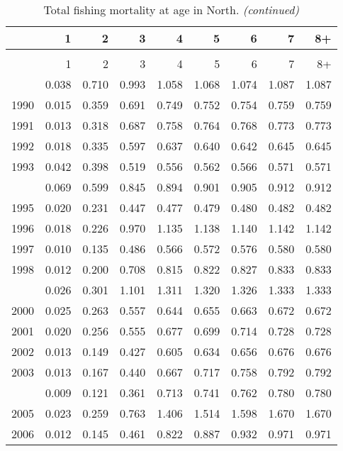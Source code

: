 \documentclass[
]{article}
\begin{document}
\begin{longtable}[t]{lrrrrrrrr}
\caption{\label{tab:North-region-FAA-table}Total fishing mortality at age in North.}\\
\toprule
  & 1 & 2 & 3 & 4 & 5 & 6 & 7 & 8+\\
\midrule
\endfirsthead
\caption[]{Total fishing mortality at age in North. \textit{(continued)}}\\
\toprule
  & 1 & 2 & 3 & 4 & 5 & 6 & 7 & 8+\\
\midrule
\endhead

\endfoot
\bottomrule
\endlastfoot
1989 & 0.038 & 0.710 & 0.993 & 1.058 & 1.068 & 1.074 & 1.087 & 1.087\\
1990 & 0.015 & 0.359 & 0.691 & 0.749 & 0.752 & 0.754 & 0.759 & 0.759\\
1991 & 0.013 & 0.318 & 0.687 & 0.758 & 0.764 & 0.768 & 0.773 & 0.773\\
1992 & 0.018 & 0.335 & 0.597 & 0.637 & 0.640 & 0.642 & 0.645 & 0.645\\
1993 & 0.042 & 0.398 & 0.519 & 0.556 & 0.562 & 0.566 & 0.571 & 0.571\\
\addlinespace
1994 & 0.069 & 0.599 & 0.845 & 0.894 & 0.901 & 0.905 & 0.912 & 0.912\\
1995 & 0.020 & 0.231 & 0.447 & 0.477 & 0.479 & 0.480 & 0.482 & 0.482\\
1996 & 0.018 & 0.226 & 0.970 & 1.135 & 1.138 & 1.140 & 1.142 & 1.142\\
1997 & 0.010 & 0.135 & 0.486 & 0.566 & 0.572 & 0.576 & 0.580 & 0.580\\
1998 & 0.012 & 0.200 & 0.708 & 0.815 & 0.822 & 0.827 & 0.833 & 0.833\\
\addlinespace
1999 & 0.026 & 0.301 & 1.101 & 1.311 & 1.320 & 1.326 & 1.333 & 1.333\\
2000 & 0.025 & 0.263 & 0.557 & 0.644 & 0.655 & 0.663 & 0.672 & 0.672\\
2001 & 0.020 & 0.256 & 0.555 & 0.677 & 0.699 & 0.714 & 0.728 & 0.728\\
2002 & 0.013 & 0.149 & 0.427 & 0.605 & 0.634 & 0.656 & 0.676 & 0.676\\
2003 & 0.013 & 0.167 & 0.440 & 0.667 & 0.717 & 0.758 & 0.792 & 0.792\\
\addlinespace
2004 & 0.009 & 0.121 & 0.361 & 0.713 & 0.741 & 0.762 & 0.780 & 0.780\\
2005 & 0.023 & 0.259 & 0.763 & 1.406 & 1.514 & 1.598 & 1.670 & 1.670\\
2006 & 0.012 & 0.145 & 0.461 & 0.822 & 0.887 & 0.932 & 0.971 & 0.971\\

\end{longtable}
\end{document}
